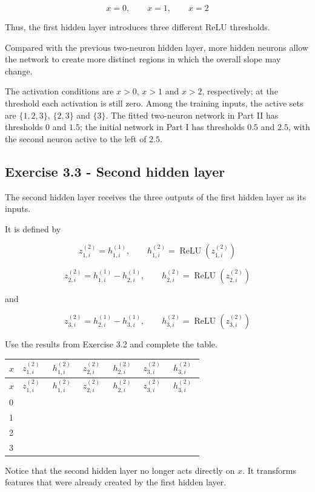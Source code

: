 \documentclass[10pt]{article}
\begin{document}
\[
x=0,\qquad x=1,\qquad x=2
\]

Thus, the first hidden layer introduces three different ReLU thresholds.

Compared with the previous two-neuron hidden layer, more hidden neurons allow the network to create more distinct regions in which the overall slope may change.


The activation conditions are $x>0$, $x>1$ and $x>2$, respectively; at the threshold each activation is still zero. Among the training inputs, the active sets are $\{1,2,3\}$, $\{2,3\}$ and $\{3\}$. The fitted two-neuron network in Part II has thresholds $0$ and $1.5$; the initial network in Part I has thresholds $0.5$ and $2.5$, with the second neuron active to the left of $2.5$.
\par\endgroup

\subsection*{Exercise 3.3 - Second hidden layer}
The second hidden layer receives the three outputs of the first hidden layer as its inputs.

It is defined by

\[
z^{(2)}_{1,i}=h^{(1)}_{1,i},
\qquad
h^{(2)}_{1,i}=\operatorname{ReLU}(z^{(2)}_{1,i})
\]

\[
z^{(2)}_{2,i}=h^{(1)}_{1,i}-h^{(1)}_{2,i},
\qquad
h^{(2)}_{2,i}=\operatorname{ReLU}(z^{(2)}_{2,i})
\]

and

\[
z^{(2)}_{3,i}=h^{(1)}_{2,i}-h^{(1)}_{3,i},
\qquad
h^{(2)}_{3,i}=\operatorname{ReLU}(z^{(2)}_{3,i})
\]

Use the results from Exercise 3.2 and complete the table.

\begingroup
\small
\setlength{\tabcolsep}{4pt}
\begin{longtable}{l|l|l|l|l|l|l}
$x$ & $z^{(2)}_{1,i}$ & $h^{(2)}_{1,i}$ & $z^{(2)}_{2,i}$ & $h^{(2)}_{2,i}$ & $z^{(2)}_{3,i}$ & $h^{(2)}_{3,i}$ \\[1.5pt]
\hline
\endfirsthead
$x$ & $z^{(2)}_{1,i}$ & $h^{(2)}_{1,i}$ & $z^{(2)}_{2,i}$ & $h^{(2)}_{2,i}$ & $z^{(2)}_{3,i}$ & $h^{(2)}_{3,i}$ \\[1.5pt]
\hline
\endhead
\rule{0pt}{2.4ex}0 &  $\phantom{-0.00}$ &  $\phantom{-0.00}$ &  $\phantom{-0.00}$ &  $\phantom{-0.00}$ &  $\phantom{-0.00}$ &  $\phantom{-0.00}$ \\[3pt]
\rule{0pt}{2.4ex}1 &  $\phantom{-0.00}$ &  $\phantom{-0.00}$ &  $\phantom{-0.00}$ &  $\phantom{-0.00}$ &  $\phantom{-0.00}$ &  $\phantom{-0.00}$ \\[3pt]
\rule{0pt}{2.4ex}2 &  $\phantom{-0.00}$ &  $\phantom{-0.00}$ &  $\phantom{-0.00}$ &  $\phantom{-0.00}$ &  $\phantom{-0.00}$ &  $\phantom{-0.00}$ \\[3pt]
\rule{0pt}{2.4ex}3 &  $\phantom{-0.00}$ &  $\phantom{-0.00}$ &  $\phantom{-0.00}$ &  $\phantom{-0.00}$ &  $\phantom{-0.00}$ &  $\phantom{-0.00}$ \\[3pt]
\end{longtable}
\endgroup
Notice that the second hidden layer no longer acts directly on $x$. It transforms features that were already created by the first hidden layer.
\end{document}
